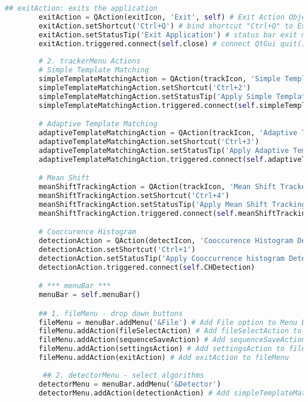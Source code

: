 \begin{lstlisting}[language=Python, caption={GUI Impementation Code}, captionpos=b, label={lst:gui}]
        ## exitAction: exits the application
        exitAction = QAction(exitIcon, 'Exit', self) # Exit Action Object
        exitAction.setShortcut('Ctrl+Q') # bind shortcut "Ctrl+Q" to Exit Button
        exitAction.setStatusTip('Exit Application') # status bar exit message
        exitAction.triggered.connect(self.close) # connect QtGui quit() method 
        
        # 2. trackerMenu Actions 
        # Simple Template Matching
        simpleTemplateMatchingAction = QAction(trackIcon, 'Simple Template Tracker', self)
        simpleTemplateMatchingAction.setShortcut('Ctrl+2')
        simpleTemplateMatchingAction.setStatusTip('Apply Simple Template Matching Algorithm')
        simpleTemplateMatchingAction.triggered.connect(self.simpleTemplateTracking)

        # Adaptive Template Matching
        adaptiveTemplateMatchingAction = QAction(trackIcon, 'Adaptive Template Tracker', self)
        adaptiveTemplateMatchingAction.setShortcut('Ctrl+3')
        adaptiveTemplateMatchingAction.setStatusTip('Apply Adaptive Template Matching Algorithm')
        adaptiveTemplateMatchingAction.triggered.connect(self.adaptiveTemplateTracking)

        # Mean Shift
        meanShiftTrackingAction = QAction(trackIcon, 'Mean Shift Tracker', self)
        meanShiftTrackingAction.setShortcut('Ctrl+4')
        meanShiftTrackingAction.setStatusTip('Apply Mean Shift Tracking Algorithm')
        meanShiftTrackingAction.triggered.connect(self.meanShiftTracking)

        # Cooccurence Histogram
        detectionAction = QAction(detectIcon, 'Cooccurence Histogram Detection', self)
        detectionAction.setShortcut('Ctrl+1')
        detectionAction.setStatusTip('Apply Cooccurrence histogram Detection')
        detectionAction.triggered.connect(self.CHDetection)

        # *** menuBar ***
        menuBar = self.menuBar() 

        ## 1. fileMenu - drop down buttons
        fileMenu = menuBar.addMenu('&File') # Add File option to Menu Bar
        fileMenu.addAction(fileSelectAction) # Add fileSelectAction to fileMenu 
        fileMenu.addAction(sequenceSaveAction) # Add sequenceSaveAction to fileMenu
        fileMenu.addAction(settingsAction) # Add settingsAction to fileMenu
        fileMenu.addAction(exitAction) # Add exitAction to fileMenu
        
         ## 2. detectorMenu - select algorithms
        detectorMenu = menuBar.addMenu('&Detector')
        detectorMenu.addAction(detectionAction) # Add simpleTemplateMatchingAction to trackerMenu
        

\end{lstlisting}
